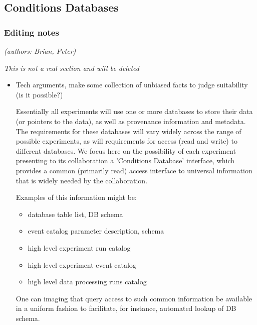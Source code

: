 \subsection{Conditions Databases}

\subsubsection{Editing notes}

\textit{(authors: Brian, Peter)}

\textit{This is not a real section and will be deleted}


\begin{itemize}
\item Tech arguments, make some collection of unbiased facts to judge suitability (is it possible?)

	Essentially all experiments will use one or more databases to
	store their data (or pointers to the data), as well as provenance 
	information and metadata.  The requirements for these databases will
	vary widely across the range of possible experiments, as will
	requirements for access (read and write) to different databases.  
	We focus here on the possibility of each experiment presenting
	to its collaboration a 'Conditions Database' interface, which
	provides a common (primarily read) access interface to universal
	information that is widely needed by the collaboration.

	Examples of this information might be:
	\begin{itemize}
	\item database table list, DB schema
	\item event catalog parameter description, schema
	\item high level experiment run catalog
	\item high level experiment event catalog
	\item high level data processing runs catalog
	\end{itemize}

	One can imaging that query access to such common information be
	available in a uniform fashion to facilitate, for instance,
	automated lookup of DB schema.  


\end{itemize}
